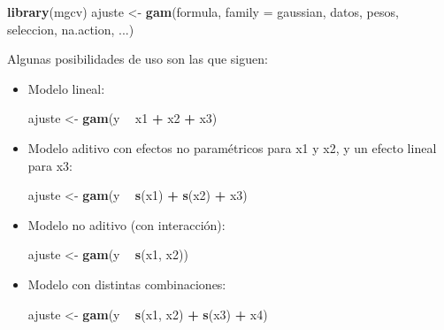 \documentclass[]{book}
\newenvironment{Shaded}{\begin{snugshade}}{\end{snugshade}}
\newcommand{\DataTypeTok}[1]{\textcolor[rgb]{0.13,0.29,0.53}{#1}}
\newcommand{\KeywordTok}[1]{\textcolor[rgb]{0.13,0.29,0.53}{\textbf{#1}}}
\newcommand{\NormalTok}[1]{#1}
\newcommand{\OperatorTok}[1]{\textcolor[rgb]{0.81,0.36,0.00}{\textbf{#1}}}
\newcommand{\StringTok}[1]{\textcolor[rgb]{0.31,0.60,0.02}{#1}}
\begin{document}
\begin{Shaded}
\begin{Highlighting}[]
\KeywordTok{library}\NormalTok{(mgcv)}
\NormalTok{ajuste <-}\StringTok{ }\KeywordTok{gam}\NormalTok{(formula, }\DataTypeTok{family =}\NormalTok{ gaussian, datos, pesos, seleccion, na.action, ...)}
\end{Highlighting}
\end{Shaded}

Algunas posibilidades de uso son las que siguen:

\begin{itemize}
\item
  Modelo lineal:

\begin{Shaded}
\begin{Highlighting}[]
\NormalTok{ajuste <-}\StringTok{ }\KeywordTok{gam}\NormalTok{(y }\OperatorTok{~}\StringTok{ }\NormalTok{x1 }\OperatorTok{+}\StringTok{ }\NormalTok{x2 }\OperatorTok{+}\StringTok{ }\NormalTok{x3)}
\end{Highlighting}
\end{Shaded}
\item
  Modelo aditivo con efectos no paramétricos para x1 y x2, y un efecto lineal para x3:

\begin{Shaded}
\begin{Highlighting}[]
\NormalTok{ajuste <-}\StringTok{ }\KeywordTok{gam}\NormalTok{(y }\OperatorTok{~}\StringTok{ }\KeywordTok{s}\NormalTok{(x1) }\OperatorTok{+}\StringTok{ }\KeywordTok{s}\NormalTok{(x2) }\OperatorTok{+}\StringTok{ }\NormalTok{x3)}
\end{Highlighting}
\end{Shaded}
\item
  Modelo no aditivo (con interacción):

\begin{Shaded}
\begin{Highlighting}[]
\NormalTok{ajuste <-}\StringTok{ }\KeywordTok{gam}\NormalTok{(y }\OperatorTok{~}\StringTok{ }\KeywordTok{s}\NormalTok{(x1, x2))}
\end{Highlighting}
\end{Shaded}
\item
  Modelo con distintas combinaciones:

\begin{Shaded}
\begin{Highlighting}[]
\NormalTok{ajuste <-}\StringTok{ }\KeywordTok{gam}\NormalTok{(y }\OperatorTok{~}\StringTok{ }\KeywordTok{s}\NormalTok{(x1, x2) }\OperatorTok{+}\StringTok{ }\KeywordTok{s}\NormalTok{(x3) }\OperatorTok{+}\StringTok{ }\NormalTok{x4)}
\end{Highlighting}
\end{Shaded}
\end{itemize}
\end{document}
